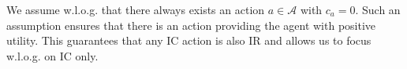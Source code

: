 %
We assume w.l.o.g. that there always exists an action $a \in \mathcal{A}$ with $c_a=0$.
%
Such an assumption ensures that there is an action providing the agent with positive utility.
%
This guarantees that any IC action is also IR and allows us to focus w.l.o.g. on IC only.
%



